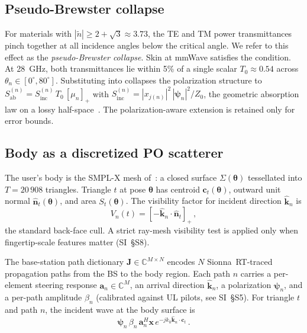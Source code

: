 \documentclass[journal,twocolumn,10pt]{IEEEtran}
\theoremstyle{plain}
\theoremstyle{definition}
\theoremstyle{remark}
\newcommand{\nhat}{\hat{\bm{n}}}
\newcommand{\xx}{\mathbf{x}}
\newcommand{\Sinc}{S_{\mathrm{inc}}}
\newcommand{\Sab}{S_{\mathrm{ab}}}
\newcommand{\Jmat}{\mathbf{J}}
\newcommand{\psin}{\bm{\psi}_n}
\newcommand{\thetab}{\bm{\theta}}
\newcommand{\Tepskin}{T_{0}}
\newcommand{\Complex}{\mathbb{C}}
\newcommand{\ntilde}{\tilde{n}}
\begin{document}
\subsection{Pseudo-Brewster collapse}

For materials with $|\ntilde| \geq 2 + \sqrt{3} \approx 3.73$, the
TE and TM power transmittances pinch together at all incidence
angles below the critical angle. We refer to this effect as the
\emph{pseudo-Brewster collapse}. Skin at mmWave satisfies the
condition. At 28~GHz, both transmittances lie within 5\% of a single
scalar
$\Tepskin \approx 0.54$ across
$\theta_n \in [0^{\circ}, 80^{\circ}]$. Substituting into
 collapses the polarization structure to
$\Sab^{(n)} = \Sinc^{(n)}\,\Tepskin\,[\mu_n]_+$ with
$\Sinc^{(n)} = |x_{j(n)}|^2\,|\psin|^2 / Z_0$, the geometric
absorption law on a lossy half-space~\cite{BornWolf}. The
polarization-aware extension is retained only for error bounds.

\subsection{Body as a discretized PO scatterer}

The user's body is the SMPL-X mesh of~: a closed
surface $\Sigma(\thetab)$ tessellated into $T = 20\,908$ triangles.
Triangle $t$ at pose $\thetab$ has centroid $\bm{c}_t(\thetab)$,
outward unit normal $\nhat_t(\thetab)$, and area $S_t(\thetab)$.
The visibility factor for incident direction $\hat{\bm{k}}_n$ is
\begin{equation}\label{eq:visibility}
  V_n(t) = [-\hat{\bm{k}}_n \cdot \nhat_t]_+\,,
\end{equation}
the standard back-face cull. A strict ray-mesh visibility test is
applied only when fingertip-scale features matter
(SI~\S{}S8).

The base-station path dictionary $\Jmat \in \Complex^{M \times N}$
encodes $N$ Sionna~RT-traced propagation paths from the BS to the
body region. Each path $n$ carries a per-element steering response
$\bm{a}_n \in \Complex^{M}$, an arrival direction $\hat{\bm{k}}_n$,
a polarization $\psin$, and a per-path amplitude $\beta_n$
(calibrated against UL pilots, see SI~\S{}S5). For triangle $t$
and path $n$, the incident wave at the body surface is
\begin{equation}\label{eq:incident-wave}
  \psin\,\beta_n\,\bm{a}_n^{H}\xx\,
  e^{-jk_0 \hat{\bm{k}}_n \cdot \bm{c}_t}\,.
\end{equation}
\end{document}
